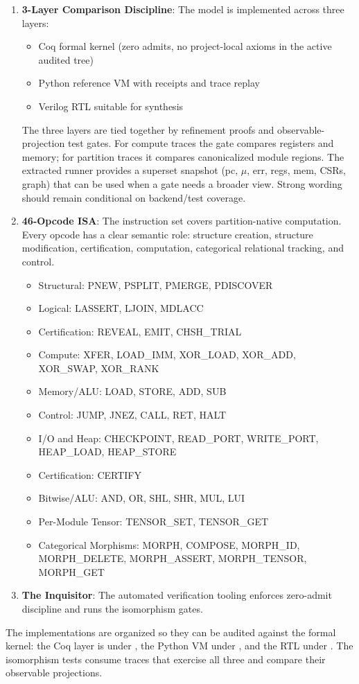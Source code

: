 \begin{enumerate}
    \item \textbf{3-Layer Comparison Discipline}: The model is implemented across three layers:
    \begin{itemize}
        \item Coq formal kernel (zero admits, no project-local axioms in the active audited tree)
        \item Python reference VM with receipts and trace replay
        \item Verilog RTL suitable for synthesis
    \end{itemize}
    The three layers are tied together by refinement proofs and observable-projection test gates. For compute traces the gate compares registers and memory; for partition traces it compares canonicalized module regions. The extracted runner provides a superset snapshot (pc, $\mu$, err, regs, mem, CSRs, graph) that can be used when a gate needs a broader view. Strong wording should remain conditional on backend/test coverage.
    
    \item \textbf{46-Opcode ISA}: The instruction set covers partition-native computation. Every opcode has a clear semantic role: structure creation, structure modification, certification, computation, categorical relational tracking, and control.
    \begin{itemize}
        \item Structural: PNEW, PSPLIT, PMERGE, PDISCOVER
        \item Logical: LASSERT, LJOIN, MDLACC
        \item Certification: REVEAL, EMIT, CHSH\_TRIAL
        \item Compute: XFER, LOAD\_IMM, XOR\_LOAD, XOR\_ADD, XOR\_SWAP, XOR\_RANK
        \item Memory/ALU: LOAD, STORE, ADD, SUB
        \item Control: JUMP, JNEZ, CALL, RET, HALT
        \item I/O and Heap: CHECKPOINT, READ\_PORT, WRITE\_PORT, HEAP\_LOAD, HEAP\_STORE
        \item Certification: CERTIFY
        \item Bitwise/ALU: AND, OR, SHL, SHR, MUL, LUI
        \item Per-Module Tensor: TENSOR\_SET, TENSOR\_GET
        \item Categorical Morphisms: MORPH, COMPOSE, MORPH\_ID, MORPH\_DELETE, MORPH\_ASSERT, MORPH\_TENSOR, MORPH\_GET
    \end{itemize}
    
    \item \textbf{The Inquisitor}: The automated verification tooling enforces zero-admit discipline and runs the isomorphism gates.
\end{enumerate}
The implementations are organized so they can be audited against the formal kernel: the Coq layer is under , the Python VM under , and the RTL under . The isomorphism tests consume traces that exercise all three and compare their observable projections.

